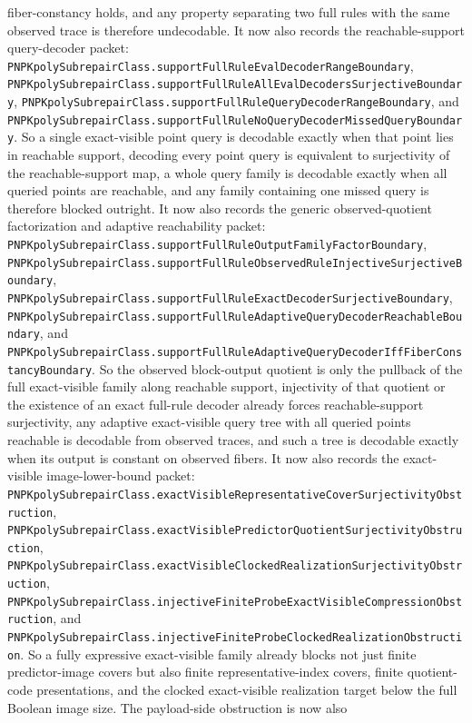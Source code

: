 \documentclass[11pt]{article}
\theoremstyle{remark}
\begin{document}
fiber-constancy holds, and any property separating two full rules with the
same observed trace is therefore undecodable.
It now also records the reachable-support query-decoder packet:
\texttt{PNPKpolySubrepairClass.supportFullRuleEvalDecoderRangeBoundary},
\texttt{PNPKpolySubrepairClass.supportFullRuleAllEvalDecodersSurjectiveBoundary},
\texttt{PNPKpolySubrepairClass.supportFullRuleQueryDecoderRangeBoundary},
and
\texttt{PNPKpolySubrepairClass.supportFullRuleNoQueryDecoderMissedQueryBoundary}.
So a single exact-visible point query is decodable exactly when that point lies
in reachable support, decoding every point query is equivalent to surjectivity
of the reachable-support map, a whole query family is decodable exactly when
all queried points are reachable, and any family containing one missed query is
therefore blocked outright.
It now also records the generic observed-quotient factorization and adaptive
reachability packet:
\texttt{PNPKpolySubrepairClass.supportFullRuleOutputFamilyFactorBoundary},
\texttt{PNPKpolySubrepairClass.supportFullRuleObservedRuleInjectiveSurjectiveBoundary},
\texttt{PNPKpolySubrepairClass.supportFullRuleExactDecoderSurjectiveBoundary},
\texttt{PNPKpolySubrepairClass.supportFullRuleAdaptiveQueryDecoderReachableBoundary},
and
\texttt{PNPKpolySubrepairClass.supportFullRuleAdaptiveQueryDecoderIffFiberConstancyBoundary}.
So the observed block-output quotient is only the pullback of the full
exact-visible family along reachable support, injectivity of that quotient or
the existence of an exact full-rule decoder already forces reachable-support
surjectivity, any adaptive exact-visible query tree with all queried points
reachable is decodable from observed traces, and such a tree is decodable
exactly when its output is constant on observed fibers.
It now also records the exact-visible image-lower-bound packet:
\texttt{PNPKpolySubrepairClass.exactVisibleRepresentativeCoverSurjectivityObstruction},
\texttt{PNPKpolySubrepairClass.exactVisiblePredictorQuotientSurjectivityObstruction},
\texttt{PNPKpolySubrepairClass.exactVisibleClockedRealizationSurjectivityObstruction},
\texttt{PNPKpolySubrepairClass.injectiveFiniteProbeExactVisibleCompressionObstruction},
and
\texttt{PNPKpolySubrepairClass.injectiveFiniteProbeClockedRealizationObstruction}.
So a fully expressive exact-visible family already blocks not just finite
predictor-image covers but also finite representative-index covers, finite
quotient-code presentations, and the clocked exact-visible realization target
below the full Boolean image size.  The payload-side obstruction is now also
\end{document}
